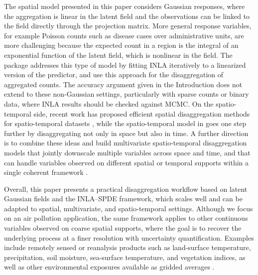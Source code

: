 The spatial model presented in this paper considers Gaussian responses, where the aggregation is linear in the latent field and the observations can be linked to the field directly through the projection matrix. More general response variables, for example Poisson counts such as disease cases over administrative units, are more challenging because the expected count in a region is the integral of an exponential function of the latent field, which is nonlinear in the field. The  package \citep{lindgren2024inlabru} addresses this type of model by fitting INLA iteratively to a linearized version of the predictor, and \citep{suen2026coherent} use this approach for the disaggregation of aggregated counts. The accuracy argument given in the Introduction does not extend to these non-Gaussian settings, particularly with sparse counts or binary data, where INLA results should be checked against MCMC. On the spatio-temporal side, recent work has proposed efficient spatial disaggregation methods for spatio-temporal datasets \citep{gaedke2025acceleratedspatiotemporalbayesianmodeling}, while the spatio-temporal model in \citep{avellaneda2025bayesianspatiotemporaldisaggregationmodeling} goes one step further by disaggregating not only in space but also in time. A further direction is to combine these ideas and build multivariate spatio-temporal disaggregation models that jointly downscale multiple variables across space and time, and that can handle variables observed on different spatial or temporal supports within a single coherent framework \citep{zhongetal25}.

Overall, this paper presents a practical disaggregation workflow based on latent Gaussian fields and the INLA--SPDE framework, which scales well and can be adapted to spatial, multivariate, and spatio-temporal settings. Although we focus on an air pollution application, the same framework applies to other continuous variables observed on coarse spatial supports, where the goal is to recover the underlying process at a finer resolution with uncertainty quantification. Examples include remotely sensed or reanalysis products such as land-surface temperature, precipitation, soil moisture, sea-surface temperature, and vegetation indices, as well as other environmental exposures available as gridded averages \citep{moragaandbaker22, forlani2020joint, gomez2019multivariate}.



\address{%
Fernando Rodriguez Avellaneda\\
King Abdullah University of Science and Technology (KAUST)\\%
Thuwal, Saudi Arabia\\
%
\url{https://linkedin.com/in/fr-avellaneda}\\%
\textit{ORCiD: \href{https://orcid.org/0009-0000-0937-0698}{0009-0000-0937-0698}}\\%
\href{mailto:fernando.rodriguezavellaneda@kaust.edu.sa}{\nolinkurl{fernando.rodriguezavellaneda@kaust.edu.sa}}%
}

